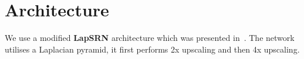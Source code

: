 \documentclass{scrartcl}
\begin{document}





\section{Architecture}
We use a modified \textbf{LapSRN} architecture which was presented in~\cite{LapSRN}.
The network utilises a Laplacian pyramid, it first performs 2x upscaling and then 4x upscaling.
\end{document}
